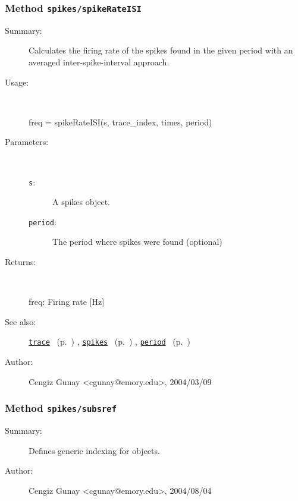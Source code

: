 \subsubsection[Method \texttt{spikeRateISI}]{Method \texttt{spikes/spikeRateISI}}%
%
\label{ref_spikes__spikeRateISI}%
\hypertarget{ref_spikes__spikeRateISI}{}%
\begin{description}
\item[Summary:]Calculates the firing rate of the spikes found in the given 
		period with an averaged inter-spike-interval approach.
%
\item[Usage:]~%
\begin{lyxcode}%
freq = spikeRateISI(s, trace\_index, times, period)
%
\end{lyxcode}%
%
%
\item[Parameters:]~
\begin{description}%
\item[\texttt{s}:]
 A spikes object.
\item[\texttt{period}:]
 The period where spikes were found (optional)
\end{description}%
%
\item[Returns:
]~

	freq: Firing rate [Hz]
%
%
\item[See also:]%
\hyperlink{ref_trace}{\texttt{trace}}%
\ (p.~\pageref{ref_trace})%
%
, \hyperlink{ref_spikes}{\texttt{spikes}}%
\ (p.~\pageref{ref_spikes})%
%
, \hyperlink{ref_period}{\texttt{period}}%
\ (p.~\pageref{ref_period})%
%
%
\item[Author:]%
Cengiz Gunay <cgunay@emory.edu>, 2004/03/09
%
\end{description}
\methodline%
\subsubsection[Method \texttt{subsref}]{Method \texttt{spikes/subsref}}%
%
\label{ref_spikes__subsref}%
\hypertarget{ref_spikes__subsref}{}%
\begin{description}
\item[Summary:]Defines generic indexing for objects.
%
%
%
%
%
%
%
\item[Author:]%
Cengiz Gunay <cgunay@emory.edu>, 2004/08/04
%
\end{description}
\methodline%
